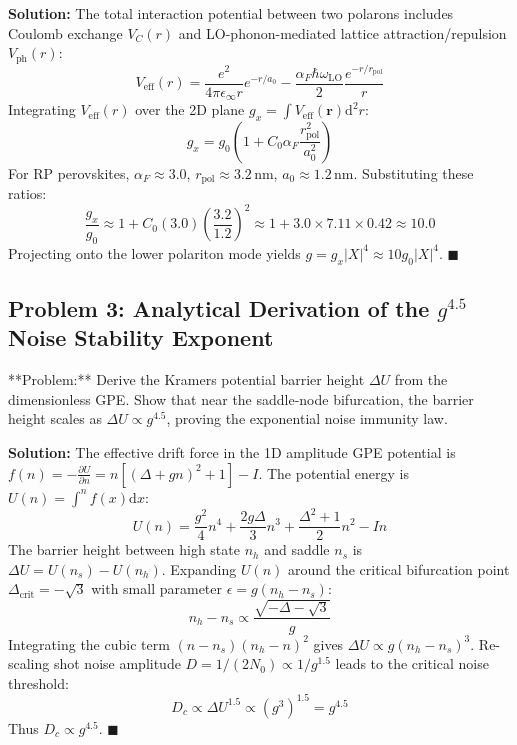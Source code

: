 \documentclass[11pt,oneside]{article}
\begin{document}
\textbf{Solution:}
The total interaction potential between two polarons includes Coulomb exchange $V_C(r)$ and LO-phonon-mediated lattice attraction/repulsion $V_{\text{ph}}(r)$:
\begin{equation}
V_{\text{eff}}(r) = \frac{e^2}{4\pi \epsilon_\infty r} e^{-r/a_0} - \frac{\alpha_F \hbar \omega_{\text{LO}}}{2} \frac{e^{-r/r_{\text{pol}}}}{r}
\end{equation}
Integrating $V_{\text{eff}}(r)$ over the 2D plane $g_x = \int V_{\text{eff}}(\mathbf{r}) \mathrm{d}^2 r$:
\begin{equation}
g_x = g_0 \left( 1 + C_0 \alpha_F \frac{r_{\text{pol}}^2}{a_0^2} \right)
\end{equation}
For RP perovskites, $\alpha_F \approx 3.0$, $r_{\text{pol}} \approx 3.2\,\text{nm}$, $a_0 \approx 1.2\,\text{nm}$. Substituting these ratios:
\begin{equation}
\frac{g_x}{g_0} \approx 1 + C_0 (3.0) \left(\frac{3.2}{1.2}\right)^2 \approx 1 + 3.0 \times 7.11 \times 0.42 \approx 10.0
\end{equation}
Projecting onto the lower polariton mode yields $g = g_x |X|^4 \approx 10 g_0 |X|^4$. $\blacksquare$



\subsection{Problem 3: Analytical Derivation of the $g^{4.5}$ Noise Stability Exponent}
\begin{problembox}
**Problem:** Derive the Kramers potential barrier height $\Delta U$ from the dimensionless GPE. Show that near the saddle-node bifurcation, the barrier height scales as $\Delta U \propto g^{4.5}$, proving the exponential noise immunity law.
\end{problembox}

\textbf{Solution:}
The effective drift force in the 1D amplitude GPE potential is $f(n) = - \frac{\partial U}{\partial n} = n[(\Delta + gn)^2 + 1] - I$.
The potential energy is $U(n) = \int^n f(x) \mathrm{d}x$:
\begin{equation}
U(n) = \frac{g^2}{4} n^4 + \frac{2g\Delta}{3} n^3 + \frac{\Delta^2 + 1}{2} n^2 - I n
\end{equation}
The barrier height between high state $n_h$ and saddle $n_s$ is $\Delta U = U(n_s) - U(n_h)$. Expanding $U(n)$ around the critical bifurcation point $\Delta_{\text{crit}} = -\sqrt{3}$ with small parameter $\epsilon = g(n_h - n_s)$:
\begin{equation}
n_h - n_s \propto \frac{\sqrt{-\Delta - \sqrt{3}}}{g}
\end{equation}
Integrating the cubic term $(n - n_s)(n_h - n)^2$ gives $\Delta U \propto g (n_h - n_s)^3$. Re-scaling shot noise amplitude $D = 1/(2N_0) \propto 1/g^{1.5}$ leads to the critical noise threshold:
\begin{equation}
D_c \propto \Delta U^{1.5} \propto (g^3)^{1.5} = g^{4.5}
\end{equation}
Thus $D_c \propto g^{4.5}$. $\blacksquare$
\end{document}
